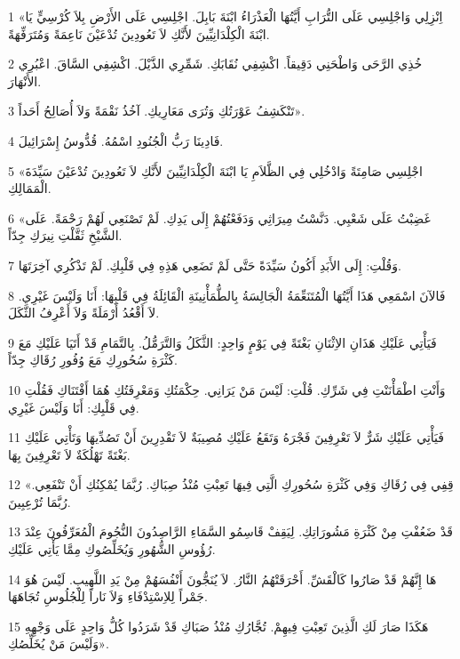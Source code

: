 \par 1 «اِنْزِلِي وَاجْلِسِي عَلَى التُّرَابِ أَيَّتُهَا الْعَذْرَاءُ ابْنَةَ بَابِلَ. اجْلِسِي عَلَى الأَرْضِ بِلاَ كُرْسِيٍّ يَا ابْنَةَ الْكِلْدَانِيِّينَ لأَنَّكِ لاَ تَعُودِينَ تُدْعَيْنَ نَاعِمَةً وَمُتَرَفِّهَةً.
\par 2 خُذِي الرَّحَى وَاطْحَنِي دَقِيقاً. اكْشِفِي نُقَابَكِ. شَمِّرِي الذَّيْلَ. اكْشِفِي السَّاقَ. اعْبُرِي الأَنْهَارَ.
\par 3 تَنْكَشِفُ عَوْرَتُكِ وَتُرَى مَعَارِيكِ. آخُذُ نَقْمَةً وَلاَ أُصَالِحُ أَحَداً».
\par 4 فَادِينَا رَبُّ الْجُنُودِ اسْمُهُ. قُدُّوسُ إِسْرَائِيلَ.
\par 5 «اجْلِسِي صَامِتَةً وَادْخُلِي فِي الظَّلاَمِ يَا ابْنَةَ الْكِلْدَانِيِّينَ لأَنَّكِ لاَ تَعُودِينَ تُدْعَيْنَ سَيِّدَةَ الْمَمَالِكِ.
\par 6 «غَضِبْتُ عَلَى شَعْبِي. دَنَّسْتُ مِيرَاثِي وَدَفَعْتُهُمْ إِلَى يَدِكِ. لَمْ تَصْنَعِي لَهُمْ رَحْمَةً. عَلَى الشَّيْخِ ثَقَّلْتِ نِيرَكِ جِدّاً.
\par 7 وَقُلْتِ: إِلَى الأَبَدِ أَكُونُ سَيِّدَةً حَتَّى لَمْ تَضَعِي هَذِهِ فِي قَلْبِكِ. لَمْ تَذْكُرِي آخِرَتَهَا.
\par 8 فَالآنَ اسْمَعِي هَذَا أَيَّتُهَا الْمُتَنَعِّمَةُ الْجَالِسَةُ بِالطُّمَأْنِينَةِ الْقَائِلَةُ فِي قَلْبِهَا: أَنَا وَلَيْسَ غَيْرِي. لاَ أَقْعُدُ أَرْمَلَةً وَلاَ أَعْرِفُ الثَّكَلَ.
\par 9 فَيَأْتِي عَلَيْكِ هَذَانِ الاِثْنَانِ بَغْتَةً فِي يَوْمٍ وَاحِدٍ: الثَّكَلُ وَالتَّرَمُّلُ. بِالتَّمَامِ قَدْ أَتَيَا عَلَيْكِ مَعَ كَثْرَةِ سُحُورِكِ مَعَ وُفُورِ رُقَاكِ جِدّاً.
\par 10 وَأَنْتِ اطْمَأْنَنْتِ فِي شَرِّكِ. قُلْتِ: لَيْسَ مَنْ يَرَانِي. حِكْمَتُكِ وَمَعْرِفَتُكِ هُمَا أَفْتَنَاكِ فَقُلْتِ فِي قَلْبِكِ: أَنَا وَلَيْسَ غَيْرِي.
\par 11 فَيَأْتِي عَلَيْكِ شَرٌّ لاَ تَعْرِفِينَ فَجْرَهُ وَتَقَعُ عَلَيْكِ مُصِيبَةٌ لاَ تَقْدِرِينَ أَنْ تَصُدِّيهَا وَتَأْتِي عَلَيْكِ بَغْتَةً تَهْلُكَةٌ لاَ تَعْرِفِينَ بِهَا.
\par 12 «قِفِي فِي رُقَاكِ وَفِي كَثْرَةِ سُحُورِكِ الَّتِي فِيهَا تَعِبْتِ مُنْذُ صِبَاكِ. رُبَّمَا يُمْكِنُكِ أَنْ تَنْفَعِي. رُبَّمَا تُرْعِبِينَ.
\par 13 قَدْ ضَعُفْتِ مِنْ كَثْرَةِ مَشُورَاتِكِ. لِيَقِفْ قَاسِمُو السَّمَاءِ الرَّاصِدُونَ النُّجُومَ الْمُعَرِّفُونَ عِنْدَ رُؤُوسِ الشُّهُورِ وَيُخَلِّصُوكِ مِمَّا يَأْتِي عَلَيْكِ.
\par 14 هَا إِنَّهُمْ قَدْ صَارُوا كَالْقَشِّ. أَحْرَقَتْهُمُ النَّارُ. لاَ يُنَجُّونَ أَنْفُسَهُمْ مِنْ يَدِ اللَّهِيبِ. لَيْسَ هُوَ جَمْراً لِلاِسْتِدْفَاءِ وَلاَ نَاراً لِلْجُلُوسِ تُجَاهَهَا.
\par 15 هَكَذَا صَارَ لَكِ الَّذِينَ تَعِبْتِ فِيهِمْ. تُجَّارُكِ مُنْذُ صَبَاكِ قَدْ شَرَدُوا كُلُّ وَاحِدٍ عَلَى وَجْهِهِ وَلَيْسَ مَنْ يُخَلِّصُكِ».

